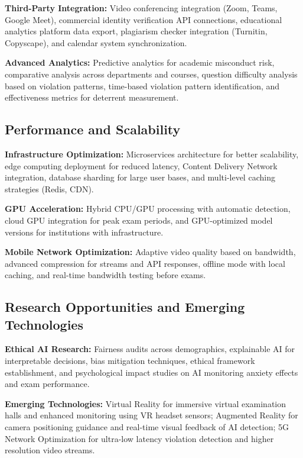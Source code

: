 \textbf{Third-Party Integration:} Video conferencing integration (Zoom, Teams, Google Meet), commercial identity verification API connections, educational analytics platform data export, plagiarism checker integration (Turnitin, Copyscape), and calendar system synchronization.

\textbf{Advanced Analytics:} Predictive analytics for academic misconduct risk, comparative analysis across departments and courses, question difficulty analysis based on violation patterns, time-based violation pattern identification, and effectiveness metrics for deterrent measurement.

\subsection{Performance and Scalability}

\textbf{Infrastructure Optimization:} Microservices architecture for better scalability, edge computing deployment for reduced latency, Content Delivery Network integration, database sharding for large user bases, and multi-level caching strategies (Redis, CDN).

\textbf{GPU Acceleration:} Hybrid CPU/GPU processing with automatic detection, cloud GPU integration for peak exam periods, and GPU-optimized model versions for institutions with infrastructure.

\textbf{Mobile Network Optimization:} Adaptive video quality based on bandwidth, advanced compression for streams and API responses, offline mode with local caching, and real-time bandwidth testing before exams.

\subsection{Research Opportunities and Emerging Technologies}

\textbf{Ethical AI Research:} Fairness audits across demographics, explainable AI for interpretable decisions, bias mitigation techniques, ethical framework establishment, and psychological impact studies on AI monitoring anxiety effects and exam performance.

\textbf{Emerging Technologies:} Virtual Reality for immersive virtual examination halls and enhanced monitoring using VR headset sensors; Augmented Reality for camera positioning guidance and real-time visual feedback of AI detection; 5G Network Optimization for ultra-low latency violation detection and higher resolution video streams.

